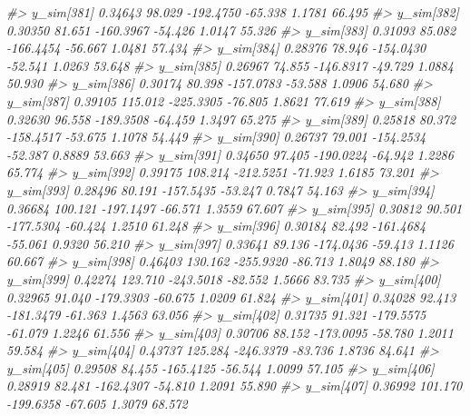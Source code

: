 \documentclass[
  10pt,
  italian,
  a4paper,
  extrafontsizes,onecolumn,openright
  ]{memoir}
\newenvironment{Shaded}{\begin{snugshade}}{\end{snugshade}}
\newcommand{\CommentTok}[1]{\textcolor[rgb]{0.56,0.35,0.01}{\textit{#1}}}
\begin{document}
\begin{Shaded}
\begin{Highlighting}[]
\CommentTok{\#\textgreater{}   y\_sim[381]  0.34643  98.029 {-}192.4750 {-}65.338  1.1781 66.495}
\CommentTok{\#\textgreater{}   y\_sim[382]  0.30350  81.651 {-}160.3967 {-}54.426  1.0147 55.326}
\CommentTok{\#\textgreater{}   y\_sim[383]  0.31093  85.082 {-}166.4454 {-}56.667  1.0481 57.434}
\CommentTok{\#\textgreater{}   y\_sim[384]  0.28376  78.946 {-}154.0430 {-}52.541  1.0263 53.648}
\CommentTok{\#\textgreater{}   y\_sim[385]  0.26967  74.855 {-}146.8317 {-}49.729  1.0884 50.930}
\CommentTok{\#\textgreater{}   y\_sim[386]  0.30174  80.398 {-}157.0783 {-}53.588  1.0906 54.680}
\CommentTok{\#\textgreater{}   y\_sim[387]  0.39105 115.012 {-}225.3305 {-}76.805  1.8621 77.619}
\CommentTok{\#\textgreater{}   y\_sim[388]  0.32630  96.558 {-}189.3508 {-}64.459  1.3497 65.275}
\CommentTok{\#\textgreater{}   y\_sim[389]  0.25818  80.372 {-}158.4517 {-}53.675  1.1078 54.449}
\CommentTok{\#\textgreater{}   y\_sim[390]  0.26737  79.001 {-}154.2534 {-}52.387  0.8889 53.663}
\CommentTok{\#\textgreater{}   y\_sim[391]  0.34650  97.405 {-}190.0224 {-}64.942  1.2286 65.774}
\CommentTok{\#\textgreater{}   y\_sim[392]  0.39175 108.214 {-}212.5251 {-}71.923  1.6185 73.201}
\CommentTok{\#\textgreater{}   y\_sim[393]  0.28496  80.191 {-}157.5435 {-}53.247  0.7847 54.163}
\CommentTok{\#\textgreater{}   y\_sim[394]  0.36684 100.121 {-}197.1497 {-}66.571  1.3559 67.607}
\CommentTok{\#\textgreater{}   y\_sim[395]  0.30812  90.501 {-}177.5304 {-}60.424  1.2510 61.248}
\CommentTok{\#\textgreater{}   y\_sim[396]  0.30184  82.492 {-}161.4684 {-}55.061  0.9320 56.210}
\CommentTok{\#\textgreater{}   y\_sim[397]  0.33641  89.136 {-}174.0436 {-}59.413  1.1126 60.667}
\CommentTok{\#\textgreater{}   y\_sim[398]  0.46403 130.162 {-}255.9320 {-}86.713  1.8049 88.180}
\CommentTok{\#\textgreater{}   y\_sim[399]  0.42274 123.710 {-}243.5018 {-}82.552  1.5666 83.735}
\CommentTok{\#\textgreater{}   y\_sim[400]  0.32965  91.040 {-}179.3303 {-}60.675  1.0209 61.824}
\CommentTok{\#\textgreater{}   y\_sim[401]  0.34028  92.413 {-}181.3479 {-}61.363  1.4563 63.056}
\CommentTok{\#\textgreater{}   y\_sim[402]  0.31735  91.321 {-}179.5575 {-}61.079  1.2246 61.556}
\CommentTok{\#\textgreater{}   y\_sim[403]  0.30706  88.152 {-}173.0095 {-}58.780  1.2011 59.584}
\CommentTok{\#\textgreater{}   y\_sim[404]  0.43737 125.284 {-}246.3379 {-}83.736  1.8736 84.641}
\CommentTok{\#\textgreater{}   y\_sim[405]  0.29508  84.455 {-}165.4125 {-}56.544  1.0099 57.105}
\CommentTok{\#\textgreater{}   y\_sim[406]  0.28919  82.481 {-}162.4307 {-}54.810  1.2091 55.890}
\CommentTok{\#\textgreater{}   y\_sim[407]  0.36992 101.170 {-}199.6358 {-}67.605  1.3079 68.572}

\end{Highlighting}
\end{Shaded}
\end{document}
